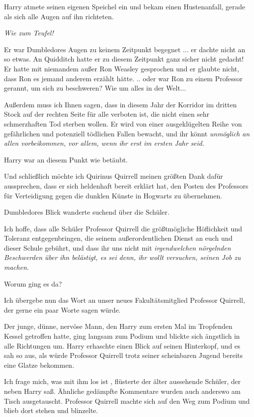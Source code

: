 Harry atmete seinen eigenen Speichel ein und bekam einen Hustenanfall, gerade
als sich alle Augen auf ihn richteten.

\emph{Wie zum Teufel! }

Er war Dumbledores Augen zu keinem Zeitpunkt begegnet ... er dachte nicht an so
etwas. An Quidditch hatte er zu diesem Zeitpunkt ganz sicher nicht gedacht! Er
hatte mit niemandem außer Ron Weasley gesprochen und er glaubte nicht, dass Ron
es jemand anderem erzählt hätte. .. oder war Ron zu einem Professor gerannt, um
sich zu beschweren? Wie um alles in der Welt...

\glqq Außerdem muss ich Ihnen sagen, dass in diesem Jahr der Korridor im dritten
Stock auf der rechten Seite für alle verboten ist, die nicht einen sehr
schmerzhaften Tod sterben wollen. Er wird von einer ausgeklügelten Reihe von
gefährlichen und potenziell tödlichen Fallen bewacht, und ihr könnt
\emph{unmöglich an allen vorbeikommen, vor allem, wenn ihr erst im ersten Jahr
seid.}\grqq{}

Harry war an diesem Punkt wie betäubt.

\glqq Und schließlich möchte ich Quirinus Quirrell meinen größten Dank dafür
aussprechen, dass er sich heldenhaft bereit erklärt hat, den Posten des
Professors für Verteidigung gegen die dunklen Künste in Hogwarts zu
übernehmen.\grqq{}

Dumbledores Blick wanderte suchend über die Schüler.

\glqq Ich hoffe, dass alle Schüler Professor Quirrell die größtmögliche
Höflichkeit und Toleranz entgegenbringen, die seinem außerordentlichen Dienst an
euch und dieser Schule gebührt, und dass ihr uns nicht mit\emph{ irgendwelchen
nörgelnden Beschwerden über ihn belästigt, es sei denn, ihr wollt versuchen,
seinen Job zu machen.}\grqq{}

Worum ging es da?

\glqq Ich übergebe nun das Wort an unser neues Fakultätsmitglied Professor
Quirrell, der gerne ein paar Worte sagen würde.\grqq{}

Der junge, dünne, nervöse Mann, den Harry zum ersten Mal im Tropfenden Kessel
getroffen hatte, ging langsam zum Podium und blickte sich ängstlich in alle
Richtungen um. Harry erhaschte einen Blick auf seinen Hinterkopf, und es sah so
aus, als würde Professor Quirrell trotz seiner scheinbaren Jugend bereits eine
Glatze bekommen.

\glqq Ich frage mich, was mit ihm los ist\grqq{} , flüsterte der älter
aussehende Schüler, der neben Harry saß. Ähnliche gedämpfte Kommentare wurden
auch anderswo am Tisch ausgetauscht. Professor Quirrell machte sich auf den Weg
zum Podium und blieb dort stehen und blinzelte.

